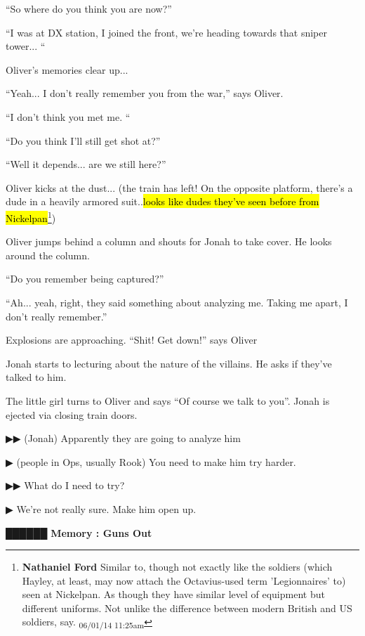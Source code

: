 ``So where do you think you are now?''

``I was at DX station, I joined the front, we're heading towards that sniper tower... ``

Oliver's memories clear up...

``Yeah... I don't really remember you from the war,'' says Oliver.

``I don't think you met me. ``

``Do you think I'll still get shot at?''

``Well it depends... are we still here?''

Oliver kicks at the dust...  (the train has left!  On the opposite platform, there's a dude in a heavily armored suit..\hl{looks like dudes they've seen before from Nickelpan}\footnote{\textbf{Nathaniel Ford }Similar to, though not exactly like the soldiers (which Hayley, at least, may now attach the Octavius-used term 'Legionnaires' to) seen at Nickelpan. As though they have similar level of equipment but different uniforms. Not unlike the difference between modern British and US soldiers, say. \textsubscript{06/01/14 11:25am}}) 

Oliver jumps behind a column and shouts for Jonah to take cover.  He looks around the column.

``Do you remember being captured?''

``Ah... yeah, right, they said something about analyzing me.  Taking me apart, I don't really remember.''

Explosions are approaching. ``Shit! Get down!'' says Oliver

Jonah starts to lecturing about the nature of the villains.  He asks if they've talked to him.

The little girl turns to Oliver and says ``Of course we talk to you''.  Jonah is ejected via closing train doors. 



 {\color[RGB]{68,68,68}▶▶ }  (Jonah) Apparently they are going to analyze him

 {\color[RGB]{68,68,68}▶ } (people in Ops, usually Rook) You need to make him try harder.  

 {\color[RGB]{68,68,68}▶▶ } What do I need to try?

 {\color[RGB]{68,68,68}▶ } We're not really sure. Make him open up. 



 {\LARGE \textbf{ {\color[RGB]{51,51,51}██████} } }  {\LARGE \textbf{ Memory : Guns Out} } 



